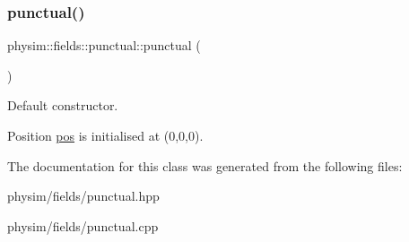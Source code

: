 \subsubsection{\texorpdfstring{punctual()}{punctual()}}
{\footnotesize\ttfamily physim\+::fields\+::punctual\+::punctual (\begin{DoxyParamCaption}{ }\end{DoxyParamCaption})}



Default constructor. 

Position \hyperlink{classphysim_1_1fields_1_1punctual_a00344d6f3e4f3f841e7d876918c66977}{pos} is initialised at (0,0,0). 

The documentation for this class was generated from the following files\+:\begin{DoxyCompactItemize}
\item 
physim/fields/punctual.\+hpp\item 
physim/fields/punctual.\+cpp\end{DoxyCompactItemize}
